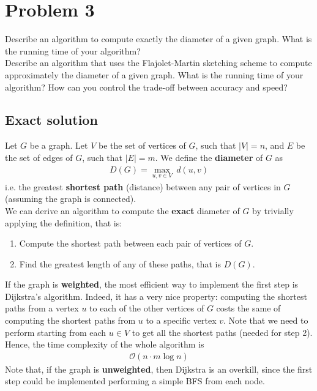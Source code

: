 
\section{Problem 3}

Describe an algorithm to compute exactly the diameter of a given graph. What is the running time of your algorithm?\\
Describe an algorithm that uses the Flajolet-Martin sketching scheme to compute approximately the diameter of a given graph.
What is the running time of your algorithm? How can you control the trade-off between accuracy and speed?

\subsection{Exact solution}

Let $G$ be a graph. Let $V$ be the set of vertices of $G$, such that $|V| = n$, and $E$ be the set of edges of $G$, such that $|E| = m$. We define the \textbf{diameter} of $G$ as
\begin{align*}
D(G) = \max_{u,v \in V} \ d(u,v)
\end{align*}
i.e. the greatest \textbf{shortest path} (distance) between any pair of vertices in $G$ (assuming the graph is connected).\\
We can derive an algorithm to compute the \textbf{exact} diameter of $G$ by trivially applying the definition, that is:
\begin{enumerate}
	\item Compute the shortest path between each pair of vertices of $G$. 
	\item Find the greatest length of any of these paths, that is $D(G)$.
\end{enumerate}
If the graph is \textbf{weighted}, the most efficient way to implement the first step is Dijkstra's algorithm\cite{dijkstra}. Indeed, it has a very nice
property: computing the shortest paths from a vertex $u$ to each of the other vertices of $G$ costs the same of computing
the shortest paths from $u$ to a specific vertex $v$. Note that we need to perform \cite{dijkstra} starting from each
$u \in V$ to get all the shortest paths (needed for step 2). Hence, the time complexity of the whole algorithm is
\begin{align*}
\mathcal{O}(n \cdot m\log{n})
\end{align*}
Note that, if the graph is \textbf{unweighted}, then Dijkstra is an overkill, since the first step could be implemented performing a simple BFS from each node.

